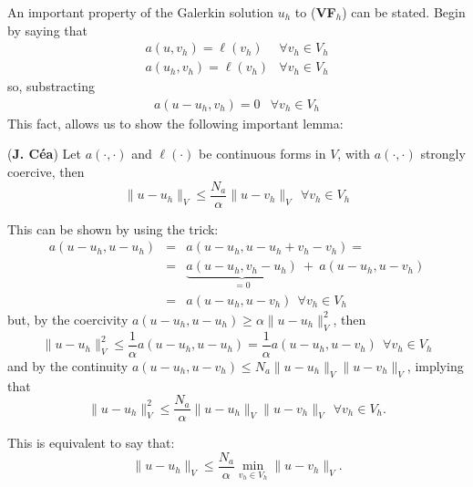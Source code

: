 An important property of the Galerkin solution $u_h$ to
(\textbf{VF}$_h$) can be stated.
Begin by saying that 
\begin{eqnarray}
a(u,v_h) = \ell(v_h) & \forall v_h \in V_h \nonumber \\
a(u_h,v_h) = \ell(v_h) & \forall v_h \in V_h \nonumber
\end{eqnarray}
so, substracting
\begin{eqnarray}
a(u - u_h,v_h) = 0 & \forall v_h \in V_h \nonumber
\end{eqnarray}
This fact, allows us to show the following important lemma:
\begin{lemma}
(\textbf{J. C\'ea})
Let $a(\cdot,\cdot)$ and $\ell(\cdot)$ be continuous forms in $V$,
with $a(\cdot,\cdot)$ strongly coercive, then
\begin{equation}
\lVert u - u_h \rVert_V \le \frac{N_a}{\alpha} \lVert u - v_h \rVert_V~~\forall v_h \in V_h
\end{equation}
\end{lemma}
This can be shown by using the trick:
\begin{eqnarray}
a(u-u_h, u-u_h) & = & a(u-u_h, u-u_h+v_h-v_h) =  \nonumber \\
& = &\underbrace{a(u-u_h,v_h-u_h)}_{=0}~+~a(u-u_h,u-v_h) \nonumber \\
& = & a(u-u_h,u-v_h)~~\forall v_h \in V_h \nonumber
\end{eqnarray}
but, by the coercivity $a(u-u_h, u-u_h) \ge \alpha \lVert u-u_h \rVert_V^2$,
then
\begin{equation}
\lVert u - u_h \rVert_V^2 \le \frac{1}{\alpha}a(u-u_h, u-u_h) = \frac{1}{\alpha}a(u-u_h, u-v_h) ~~\forall v_h \in V_h
\end{equation}
and by the continuity $a(u-u_h, u-v_h) \le N_a \lVert u-u_h \rVert_V\lVert u-v_h \rVert_V$,
implying that
\begin{equation}
\lVert u - u_h \rVert_V^2 \le \frac{N_a}{\alpha} \lVert u-u_h \rVert_V\lVert u-v_h \rVert_V ~~\forall v_h \in V_h.
\end{equation}

This is equivalent to say that:
\begin{equation}
\lVert u - u_h \rVert_V \le \frac{N_a}{\alpha} \min_{v_h \in V_h} \lVert u-v_h \rVert_V.
\end{equation}

